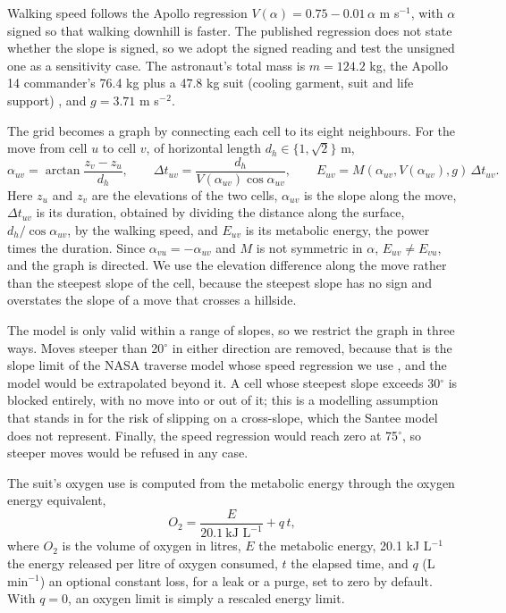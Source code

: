 \documentclass[11pt,a4paper]{article}
\begin{document}
Walking speed follows the Apollo regression $V(\alpha) = 0.75 - 0.01\,\alpha$ m s$^{-1}$, with $\alpha$ signed so that walking downhill is faster. The published regression does not state whether the slope is signed, so we adopt the signed reading and test the unsigned one as a sensitivity case. The astronaut's total mass is $m = 124.2$ kg, the Apollo 14 commander's 76.4 kg plus a 47.8 kg suit (cooling garment, suit and life support) \cite{Carr2003}, and $g = 3.71$ m s$^{-}$$^{2}$.

The grid becomes a graph by connecting each cell to its eight neighbours. For the move from cell $u$ to cell $v$, of horizontal length $d_h \in \{1, \sqrt2\}$ m, \[\alpha_{uv} = \arctan\frac{z_v - z_u}{d_h},\qquad \Delta t_{uv} = \frac{d_h}{V(\alpha_{uv})\cos\alpha_{uv}},\qquad E_{uv} = M(\alpha_{uv}, V(\alpha_{uv}), g)\,\Delta t_{uv}.\] Here $z_u$ and $z_v$ are the elevations of the two cells, $\alpha_{uv}$ is the slope along the move, $\Delta t_{uv}$ is its duration, obtained by dividing the distance along the surface, $d_h/\cos\alpha_{uv}$, by the walking speed, and $E_{uv}$ is its metabolic energy, the power times the duration. Since $\alpha_{vu} = -\alpha_{uv}$ and $M$ is not symmetric in $\alpha$, $E_{uv} \neq E_{vu}$, and the graph is directed. We use the elevation difference along the move rather than the steepest slope of the cell, because the steepest slope has no sign and overstates the slope of a move that crosses a hillside.

The model is only valid within a range of slopes, so we restrict the graph in three ways. Moves steeper than 20$^\circ$ in either direction are removed, because that is the slope limit of the NASA traverse model whose speed regression we use \cite{Kim2025}, and the model would be extrapolated beyond it. A cell whose steepest slope exceeds 30$^\circ$ is blocked entirely, with no move into or out of it; this is a modelling assumption that stands in for the risk of slipping on a cross-slope, which the Santee model does not represent. Finally, the speed regression would reach zero at 75$^\circ$, so steeper moves would be refused in any case.

The suit's oxygen use is computed from the metabolic energy through the oxygen energy equivalent, \[O_2 = \frac{E}{20.1\ \text{kJ L}^{-1}} + q\,t,\] where $O_2$ is the volume of oxygen in litres, $E$ the metabolic energy, 20.1 kJ L$^{-1}$ the energy released per litre of oxygen consumed, $t$ the elapsed time, and $q$ (L min$^{-1}$) an optional constant loss, for a leak or a purge, set to zero by default. With $q = 0$, an oxygen limit is simply a rescaled energy limit.
\end{document}
